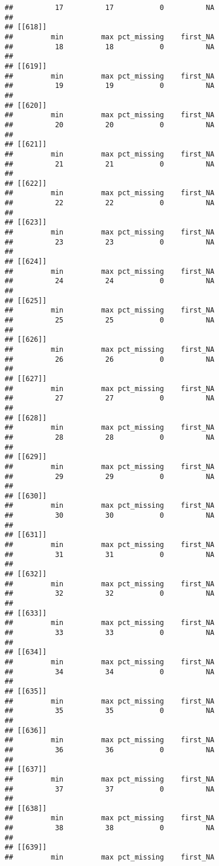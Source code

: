 \documentclass[
]{article}
\begin{document}
\begin{verbatim}
##          17          17           0          NA 
## 
## [[618]]
##         min         max pct_missing    first_NA 
##          18          18           0          NA 
## 
## [[619]]
##         min         max pct_missing    first_NA 
##          19          19           0          NA 
## 
## [[620]]
##         min         max pct_missing    first_NA 
##          20          20           0          NA 
## 
## [[621]]
##         min         max pct_missing    first_NA 
##          21          21           0          NA 
## 
## [[622]]
##         min         max pct_missing    first_NA 
##          22          22           0          NA 
## 
## [[623]]
##         min         max pct_missing    first_NA 
##          23          23           0          NA 
## 
## [[624]]
##         min         max pct_missing    first_NA 
##          24          24           0          NA 
## 
## [[625]]
##         min         max pct_missing    first_NA 
##          25          25           0          NA 
## 
## [[626]]
##         min         max pct_missing    first_NA 
##          26          26           0          NA 
## 
## [[627]]
##         min         max pct_missing    first_NA 
##          27          27           0          NA 
## 
## [[628]]
##         min         max pct_missing    first_NA 
##          28          28           0          NA 
## 
## [[629]]
##         min         max pct_missing    first_NA 
##          29          29           0          NA 
## 
## [[630]]
##         min         max pct_missing    first_NA 
##          30          30           0          NA 
## 
## [[631]]
##         min         max pct_missing    first_NA 
##          31          31           0          NA 
## 
## [[632]]
##         min         max pct_missing    first_NA 
##          32          32           0          NA 
## 
## [[633]]
##         min         max pct_missing    first_NA 
##          33          33           0          NA 
## 
## [[634]]
##         min         max pct_missing    first_NA 
##          34          34           0          NA 
## 
## [[635]]
##         min         max pct_missing    first_NA 
##          35          35           0          NA 
## 
## [[636]]
##         min         max pct_missing    first_NA 
##          36          36           0          NA 
## 
## [[637]]
##         min         max pct_missing    first_NA 
##          37          37           0          NA 
## 
## [[638]]
##         min         max pct_missing    first_NA 
##          38          38           0          NA 
## 
## [[639]]
##         min         max pct_missing    first_NA 

\end{verbatim}
\end{document}
